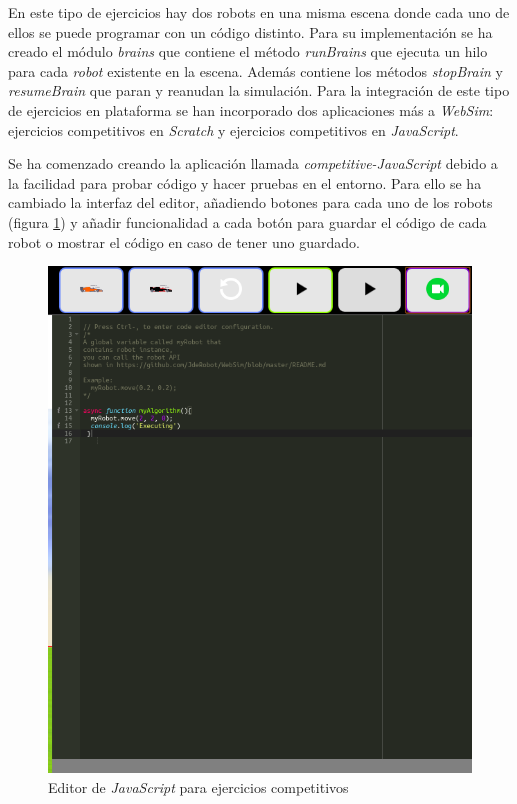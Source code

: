 En este tipo de ejercicios hay dos robots en una misma escena donde cada uno de ellos se puede programar con un código distinto. Para su implementación se ha creado el módulo \textit{brains} que contiene el método \textit{runBrains} que ejecuta un hilo para cada \textit{robot} existente en la escena. Además contiene los métodos \textit{stopBrain} y \textit{resumeBrain} que paran y reanudan la simulación. 
Para la integración de este tipo de ejercicios en plataforma se han incorporado dos aplicaciones más a \textit{WebSim}: ejercicios competitivos en \textit{Scratch} y ejercicios competitivos en \textit{JavaScript}. 

Se ha comenzado creando la aplicación llamada \textit{competitive-JavaScript} debido a la facilidad para probar código y hacer pruebas en el entorno. Para ello se ha cambiado la interfaz del editor, añadiendo botones para cada uno de los robots (figura \ref{fig:javascript_competitivo}) y añadir funcionalidad a cada botón para guardar el código de cada robot o mostrar el código en caso de tener uno guardado. %



    \begin{figure}[H]
        \centering            \includegraphics[scale=0.30]{img/competitiveEditorJavascript.png}
        \caption{Editor de \textit{JavaScript} para ejercicios competitivos}
        \label{fig:javascript_competitivo}
    \end{figure}
    

